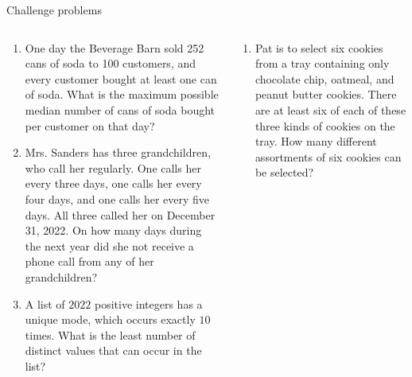 \documentclass[9pt,aspectratio=169]{beamer}
\begin{document}
\begin{frame}{Challenge problems}
  \begin{columns}[T]
    \begin{column}{0.5\textwidth}
      \begin{enumerate}
        \item One day the Beverage Barn sold 252 cans of soda to 100 customers, and every customer bought at least one can of soda. What is the maximum possible median number of cans of soda bought per customer on that day? %
        \item Mrs. Sanders has three grandchildren, who call her regularly. One calls her every three days, one calls her every four days, and one calls her every five days. All three called her on December 31, 2022. On how many days during the next year did she not receive a phone call from any of her grandchildren? %
        \item A list of $2022$ positive integers has a unique mode, which occurs exactly $10$ times. What is the least number of distinct values that can occur in the list? %
        \seti
      \end{enumerate}
    \end{column}
    \begin{column}{0.5\textwidth}
      \begin{enumerate}
        \conti
        \item Pat is to select six cookies from a tray containing only
        chocolate chip, oatmeal, and peanut butter cookies. There are at least six of
        each of these three kinds of cookies on the tray. How many different assortments
        of six cookies can be selected? %
       

      \end{enumerate}
    \end{column}
  \end{columns}
\end{frame}

\end{document}
